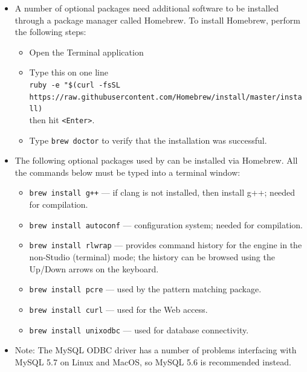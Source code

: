 \documentclass[11pt]{article}
\newcommand{\ERGO}{\mbox{\smaller{\ensuremath{\cal{E}}\smaller{{\sc{RGO}}}}}\xspace}
\newcommand{\ERGOAI}{\mbox{\smaller{\ensuremath{\cal{E}}\smaller{{\sc{RGO}}}\ensuremath{\cal{AI}}}}\xspace}
\begin{document}
\begin{itemize}
\begin{itemize}
\begin{itemize}
\begin{itemize}
      \end{itemize}
    \item A number of optional \ERGOAI packages need additional software to be
      installed through a package manager called Homebrew. To install
      Homebrew, perform the following steps:
      \begin{itemize}
      \item Open the Terminal application
      \item Type this on one line
        \\
        \texttt{ruby -e "\$(curl -fsSL\\
          \hspace*{2mm}
          https://raw.githubusercontent.com/Homebrew/install/master/install)}
        \\
        then hit \texttt{<Enter>}.
      \item Type \texttt{brew doctor} 
        to verify that the installation was successful.
      \end{itemize}
    \item The following optional packages used by \ERGOAI can be installed via
      Homebrew. All the commands below must be typed into a terminal window:
      
    \begin{itemize}
    \item \texttt{brew install g++} --- if clang is not installed, then
      install g++; needed for compilation.
    \item \texttt{brew install autoconf} --- configuration system; needed for
      compilation.
    \item \texttt{brew install rlwrap} --- provides command history for the
      \ERGOAI engine in the non-Studio (terminal) mode; the history can be
      browsed using the Up/Down arrows on the keyboard.
    \item \texttt{brew install pcre} --- used by the \ERGO pattern matching
      package.
    \item \texttt{brew install curl} --- used for the Web access.
    \item \texttt{brew install unixodbc} --- used for database connectivity.
    \end{itemize}
  \item Note: The MySQL ODBC driver has a number of problems interfacing
    with MySQL 5.7 on Linux and MacOS, so MySQL 5.6 is recommended instead.
  \end{itemize}
\end{itemize}
\end{itemize}
\end{document}
